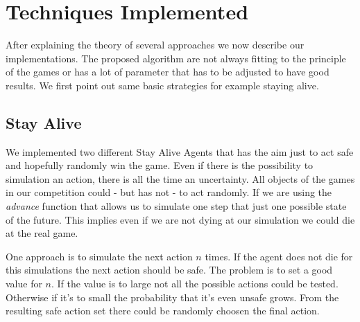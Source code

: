 \section{Techniques Implemented} 
\label{sec:exp}

After explaining the theory of several approaches we now describe our implementations. The proposed algorithm are not always fitting to 
the principle of the games or has a lot of parameter that has to be adjusted to have good results. We first point out same basic strategies
for example staying alive.


\subsection{Stay Alive} 

We implemented two different Stay Alive Agents that has the aim just to act safe and hopefully randomly win the game.
Even if there is the possibility to simulation an action, there is all the time an uncertainty. All objects of the games in our competition
could - but has not - to act randomly. If we are using the \textit{advance} function that allows us to simulate one step that just
one possible state of the future. This implies even if we are not dying at our simulation we could die at the real game.

One approach is to simulate the next action $n$ times. If the agent does not die for this simulations the next action should be safe.
The problem is to set a good value for $n$. If the value is to large not all the possible actions could be tested. Otherwise 
if it's to small the probability that it's even unsafe grows.
From the resulting safe action set there could be randomly choosen the final action.

